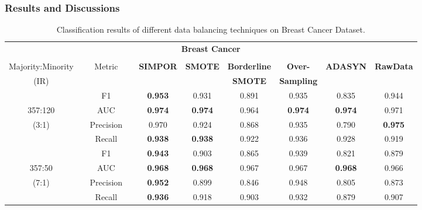 \subsubsection{Results and Discussions}  

\begin{table}[th!]
	\centering
	\caption{Classification results of different data balancing techniques on Breast Cancer Dataset.}
	\label{tab:breastCancerResult}
	
	\begin{tabular}{rrcrcccccc}
		\toprule
		\multicolumn{10}{c}{\textbf{     Breast Cancer}} \\
		&       &       &       &       &       &       &       &       &  \\
		\multicolumn{1}{c}{Majority:Minority} &       & Metric &       & \textbf{SIMPOR} & \textbf{SMOTE} & \textbf{Borderline} & \textbf{Over-} & \textbf{ADASYN} & \textbf{RawData} \\
		\multicolumn{1}{c}{(IR)} &       &       &       &       &       & \textbf{SMOTE} & \textbf{Sampling} &       &  \\
		\cmidrule{1-1}\cmidrule{3-3}\cmidrule{5-10}          &       & F1    &       & \textbf{0.953} & 0.931 & 0.891 & 0.935 & 0.835 & 0.944 \\
		\multicolumn{1}{c}{357:120 } &       & AUC   &       & \textbf{0.974} & \textbf{0.974} & 0.964 & \textbf{0.974} & \textbf{0.974} & 0.971 \\
		\multicolumn{1}{c}{(3:1)} &       & Precision &       & 0.970  & 0.924 & 0.868 & 0.935 & 0.790  & \textbf{0.975} \\
		&       & Recall &       & \textbf{0.938} & \textbf{0.938} & 0.922 & 0.936 & 0.928 & 0.919 \\
		\cmidrule{1-1}\cmidrule{3-3}\cmidrule{5-10}          &       & F1    &       & \textbf{0.943} & 0.903 & 0.865 & 0.939 & 0.821 & 0.879 \\
		\multicolumn{1}{c}{357:50} &       & AUC   &       & \textbf{0.968} & \textbf{0.968} & 0.967 & 0.967 & \textbf{0.968} & 0.966 \\
		\multicolumn{1}{c}{(7:1)} &       & Precision &       & \textbf{0.952} & 0.899 & 0.846 & 0.948 & 0.805 & 0.873 \\
		&       & Recall &       & \textbf{0.936} & 0.918 & 0.903 & 0.932 & 0.879 & 0.907 \\
		\bottomrule
	\end{tabular}%
	
\end{table}%


